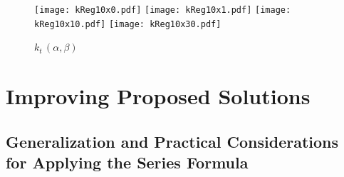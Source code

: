 \documentclass[12pt]{article}
\begin{document}
\begin{figure}
\end{figure}


\begin{figure}
  \centering
  \texttt{[image: kReg10x0.pdf]}
  \texttt{[image: kReg10x1.pdf]}
  \texttt{[image: kReg10x10.pdf]}
  \texttt{[image: kReg10x30.pdf]}
  \caption{$k_t\, (\alpha,\beta) $   \label{fig:forkn} }

\end{figure}






\section{Improving Proposed  Solutions}
\label{sec:algoforsoln}


\subsection{Generalization and Practical Considerations for Applying the Series Formula}
\label{sec:practicalformula}



\end{document}
